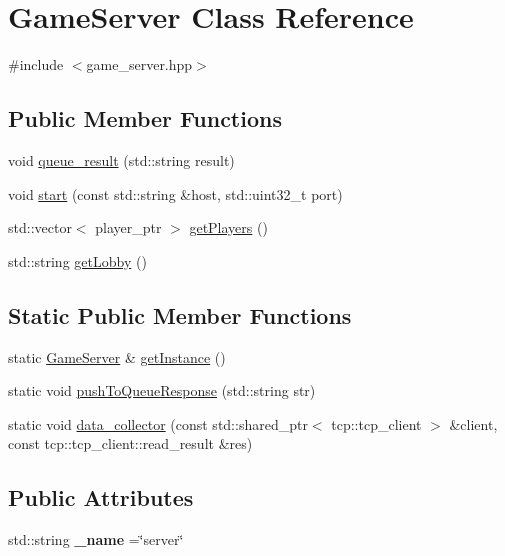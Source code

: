 \hypertarget{classGameServer}{}\section{Game\+Server Class Reference}
\label{classGameServer}


{\ttfamily \#include $<$game\+\_\+server.\+hpp$>$}

\subsection*{Public Member Functions}
\begin{DoxyCompactItemize}
\item 
void \hyperlink{classGameServer_a1059a53ce3bd5fe9fad31a16c6310104}{queue\+\_\+result} (std\+::string result)
\item 
void \hyperlink{classGameServer_a8c6534df2bb4196b7bdcd8c4f15ce8fc}{start} (const std\+::string \&host, std\+::uint32\+\_\+t port)
\item 
std\+::vector$<$ player\+\_\+ptr $>$ \hyperlink{classGameServer_a24b8a605a18de2c5a1e183e505cd7684}{get\+Players} ()
\item 
std\+::string \hyperlink{classGameServer_ac8dfcb08211ddfbf28c846c04892d0c4}{get\+Lobby} ()
\end{DoxyCompactItemize}
\subsection*{Static Public Member Functions}
\begin{DoxyCompactItemize}
\item 
static \hyperlink{classGameServer}{Game\+Server} \& \hyperlink{classGameServer_a588419f7d78b27f71b4bb2446c67b7b8}{get\+Instance} ()
\item 
static void \hyperlink{classGameServer_ac19c80082a7c4c27db9615bbb9d7ecd0}{push\+To\+Queue\+Response} (std\+::string str)
\item 
static void \hyperlink{classGameServer_ac54878b70dc19acf32ff914708b409f1}{data\+\_\+collector} (const std\+::shared\+\_\+ptr$<$ tcp\+::tcp\+\_\+client $>$ \&client, const tcp\+::tcp\+\_\+client\+::read\+\_\+result \&res)
\end{DoxyCompactItemize}
\subsection*{Public Attributes}
\begin{DoxyCompactItemize}
\item 
std\+::string {\bfseries \+\_\+name} =\char`\"{}server\char`\"{}\hypertarget{classGameServer_a48c6dc5a829d372970dbe98b0dc99d16}{}\label{classGameServer_a48c6dc5a829d372970dbe98b0dc99d16}

\end{DoxyCompactItemize}
